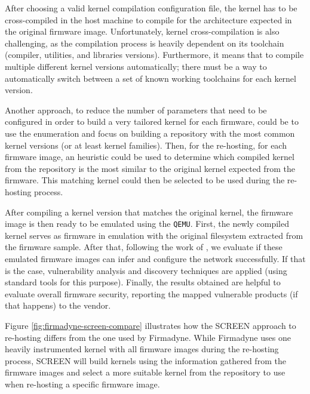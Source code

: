 \documentclass[12pt]{article}
\begin{document}
After choosing a valid kernel compilation configuration file, the kernel has to be cross-compiled in the host machine to compile for the architecture expected in the original firmware image. Unfortunately, kernel cross-compilation is also challenging, as the compilation process is heavily dependent on its toolchain (compiler, utilities, and libraries versions). Furthermore, it means that to compile multiple different kernel versions automatically; there must be a way to automatically switch between a set of known working toolchains for each kernel version.

Another approach, to reduce the number of parameters that need to be configured in order to build a very tailored kernel for each firmware, could be to use the enumeration and focus on building a repository with the most common kernel versions (or at least kernel families). Then, for the re-hosting, for each firmware image, an heuristic could be used to determine which compiled kernel from the repository is the most similar to the original kernel expected from the firmware. This matching kernel could then be selected to be used during the re-hosting process.

After compiling a kernel version that matches the original kernel, the firmware image is then ready to be emulated using the {\tt QEMU}. First, the newly compiled kernel serves as firmware in emulation with the original filesystem extracted from the firmware sample. After that, following the work of \cite{firmadyne}, we evaluate if these emulated firmware images can infer and configure the network successfully. If that is the case, vulnerability analysis and discovery techniques are applied (using standard tools for this purpose). Finally, the results obtained are helpful to evaluate overall firmware security, reporting the mapped vulnerable products (if that happens) to the vendor.

Figure \ref{fig:firmadyne-screen-compare} illustrates how the SCREEN approach to re-hosting differs from the one used by Firmadyne. While Firmadyne uses one heavily instrumented kernel with all firmware images during the re-hosting process, SCREEN will build kernels using the information gathered from the firmware images and select a more suitable kernel from the repository to use when re-hosting a specific firmware image.
\end{document}
